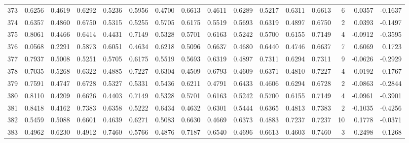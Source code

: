 \begin{tabular}{lrrrrrrrrrrrrrrr}
373 &      0.6256 &  0.4619 &  0.6292 &  0.5236 &  0.5956 &  0.4700 &  0.6613 &  0.4611 &  0.6289 &  0.5217 &   0.6311 &     0.6613 &      6 &                    0.0357 &                    -0.1637 \\
374 &      0.6357 &  0.4860 &  0.6750 &  0.5315 &  0.5255 &  0.5705 &  0.6175 &  0.5519 &  0.5693 &  0.6319 &   0.4897 &     0.6750 &      2 &                    0.0393 &                    -0.1497 \\
375 &      0.8061 &  0.4466 &  0.6414 &  0.4431 &  0.7149 &  0.5328 &  0.5701 &  0.6163 &  0.5242 &  0.5700 &   0.6155 &     0.7149 &      4 &                   -0.0912 &                    -0.3595 \\
376 &      0.0568 &  0.2291 &  0.5873 &  0.6051 &  0.4634 &  0.6218 &  0.5096 &  0.6637 &  0.4680 &  0.6440 &   0.4746 &     0.6637 &      7 &                    0.6069 &                     0.1723 \\
377 &      0.7937 &  0.5008 &  0.5251 &  0.5705 &  0.6175 &  0.5519 &  0.5693 &  0.6319 &  0.4897 &  0.7311 &   0.6294 &     0.7311 &      9 &                   -0.0626 &                    -0.2929 \\
378 &      0.7035 &  0.5268 &  0.6322 &  0.4885 &  0.7227 &  0.6304 &  0.4509 &  0.6793 &  0.4609 &  0.6371 &   0.4810 &     0.7227 &      4 &                    0.0192 &                    -0.1767 \\
379 &      0.7591 &  0.4747 &  0.6728 &  0.5327 &  0.5331 &  0.5436 &  0.6211 &  0.4791 &  0.6433 &  0.4606 &   0.6294 &     0.6728 &      2 &                   -0.0863 &                    -0.2844 \\
380 &      0.8110 &  0.4209 &  0.6626 &  0.4403 &  0.7149 &  0.5328 &  0.5701 &  0.6163 &  0.5242 &  0.5700 &   0.6155 &     0.7149 &      4 &                   -0.0961 &                    -0.3901 \\
381 &      0.8418 &  0.4162 &  0.7383 &  0.6358 &  0.5222 &  0.6434 &  0.4632 &  0.6301 &  0.5444 &  0.6365 &   0.4813 &     0.7383 &      2 &                   -0.1035 &                    -0.4256 \\
382 &      0.5459 &  0.5088 &  0.6601 &  0.4639 &  0.6271 &  0.5083 &  0.6630 &  0.4669 &  0.6373 &  0.4883 &   0.7237 &     0.7237 &     10 &                    0.1778 &                    -0.0371 \\
383 &      0.4962 &  0.6230 &  0.4912 &  0.7460 &  0.5766 &  0.4876 &  0.7187 &  0.6540 &  0.4696 &  0.6613 &   0.4603 &     0.7460 &      3 &                    0.2498 &                     0.1268 \\

\end{tabular}
